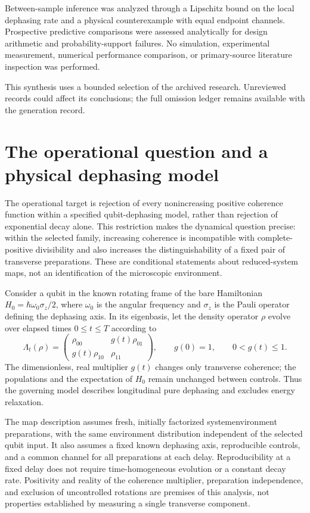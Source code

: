 \documentclass[11pt]{article}
\begin{document}
Between-sample inference was analyzed through a Lipschitz bound on the local dephasing rate and a physical counterexample with equal endpoint channels. Prospective predictive comparisons were assessed analytically for design arithmetic and probability-support failures. No simulation, experimental measurement, numerical performance comparison, or primary-source literature inspection was performed.

This synthesis uses a bounded selection of the archived research. Unreviewed records could affect its conclusions; the full omission ledger remains available with the generation record.
\section{The operational question and a physical dephasing model}
The operational target is rejection of every nonincreasing positive coherence function within a specified qubit-dephasing model, rather than rejection of exponential decay alone. This restriction makes the dynamical question precise: within the selected family, increasing coherence is incompatible with complete-positive divisibility and also increases the distinguishability of a fixed pair of transverse preparations. These are conditional statements about reduced-system maps, not an identification of the microscopic environment.

Consider a qubit in the known rotating frame of the bare Hamiltonian $H_0=\hbar\omega_0\sigma_z/2$, where $\omega_0$ is the angular frequency and $\sigma_z$ is the Pauli operator defining the dephasing axis. In its eigenbasis, let the density operator $\rho$ evolve over elapsed times $0\leq t\leq T$ according to
\[\Lambda_t(\rho)=\begin{pmatrix}\rho_{00}&g(t)\rho_{01}\\g(t)\rho_{10}&\rho_{11}\end{pmatrix},\qquad g(0)=1,\qquad 0<g(t)\leq1.\]
The dimensionless, real multiplier $g(t)$ changes only transverse coherence; the populations and the expectation of $H_0$ remain unchanged between controls. Thus the governing model describes longitudinal pure dephasing and excludes energy relaxation.

The map description assumes fresh, initially factorized system\textendash{}\allowbreak{}environment preparations, with the same environment distribution independent of the selected qubit input. It also assumes a fixed known dephasing axis, reproducible controls, and a common channel for all preparations at each delay. Reproducibility at a fixed delay does not require time-homogeneous evolution or a constant decay rate. Positivity and reality of the coherence multiplier, preparation independence, and exclusion of uncontrolled rotations are premises of this analysis, not properties established by measuring a single transverse component.
\end{document}
